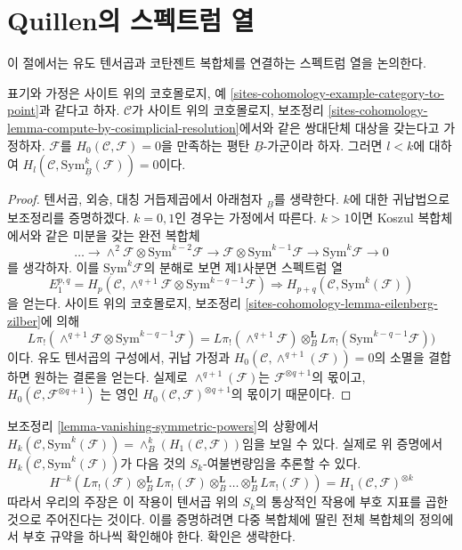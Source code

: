 \section{Quillen의 스펙트럼 열}
\label{section-spectral-sequence}

\noindent
이 절에서는 유도 텐서곱과 코탄젠트 복합체를 연결하는 스펙트럼 열을
논의한다.

\begin{lemma}
\label{lemma-vanishing-symmetric-powers}
표기와 가정은 사이트 위의 코호몰로지, 예
\ref{sites-cohomology-example-category-to-point}과 같다고 하자.
$\mathcal{C}$가 사이트 위의 코호몰로지, 보조정리
\ref{sites-cohomology-lemma-compute-by-cosimplicial-resolution}에서와 같은
쌍대단체 대상을 갖는다고 가정하자. $\mathcal{F}$를
$H_0(\mathcal{C}, \mathcal{F}) = 0$을 만족하는 평탄
$\underline{B}$-가군이라 하자. 그러면 $l < k$에 대하여
$H_l(\mathcal{C}, \text{Sym}_{\underline{B}}^k(\mathcal{F})) = 0$이다.
\end{lemma}

\begin{proof}
텐서곱, 외승, 대칭 거듭제곱에서 아래첨자 ${}_{\underline{B}}$를 생략한다.
$k$에 대한 귀납법으로 보조정리를 증명하겠다. $k = 0, 1$인 경우는
가정에서 따른다. $k > 1$이면 Koszul 복합체에서와 같은 미분을 갖는
완전 복합체
$$
\ldots \to
\wedge^2\mathcal{F} \otimes \text{Sym}^{k - 2}\mathcal{F} \to
\mathcal{F} \otimes \text{Sym}^{k - 1}\mathcal{F} \to
\text{Sym}^k\mathcal{F} \to 0
$$
를 생각하자. 이를 $\text{Sym}^k\mathcal{F}$의 분해로 보면 제1사분면
스펙트럼 열
$$
E_1^{p, q} =
H_p(\mathcal{C},
\wedge^{q + 1}\mathcal{F} \otimes \text{Sym}^{k - q - 1}\mathcal{F})
\Rightarrow
H_{p + q}(\mathcal{C}, \text{Sym}^k(\mathcal{F}))
$$
을 얻는다. 사이트 위의 코호몰로지, 보조정리
\ref{sites-cohomology-lemma-eilenberg-zilber}에 의해
$$
L\pi_!(\wedge^{q + 1}\mathcal{F} \otimes \text{Sym}^{k - q - 1}\mathcal{F}) =
L\pi_!(\wedge^{q + 1}\mathcal{F}) \otimes_B^\mathbf{L}
L\pi_!(\text{Sym}^{k - q - 1}\mathcal{F}))
$$
이다. 유도 텐서곱의 구성에서, 귀납 가정과
$H_0(\mathcal{C}, \wedge^{q + 1}(\mathcal{F})) = 0$의 소멸을 결합하면
원하는 결론을 얻는다. 실제로 $\wedge^{q + 1}(\mathcal{F})$는
$\mathcal{F}^{\otimes q + 1}$의 몫이고,
$H_0(\mathcal{C}, \mathcal{F}^{\otimes q + 1})$
는 영인 $H_0(\mathcal{C}, \mathcal{F})^{\otimes q + 1}$의 몫이기 때문이다.
\end{proof}

\begin{remark}
\label{remark-first-homology-symmetric-power}
보조정리 \ref{lemma-vanishing-symmetric-powers}의 상황에서
$H_k(\mathcal{C}, \text{Sym}^k(\mathcal{F})) =
\wedge^k_B(H_1(\mathcal{C}, \mathcal{F}))$임을 보일 수 있다. 실제로 위
증명에서 $H_k(\mathcal{C}, \text{Sym}^k(\mathcal{F}))$가 다음 것의
$S_k$-여불변량임을 추론할 수 있다.
$$
H^{-k}(L\pi_!(\mathcal{F}) \otimes_B^\mathbf{L}
L\pi_!(\mathcal{F}) \otimes_B^\mathbf{L}
\ldots \otimes_B^\mathbf{L} L\pi_!(\mathcal{F})) =
H_1(\mathcal{C}, \mathcal{F})^{\otimes k}
$$
따라서 우리의 주장은 이 작용이 텐서곱 위의 $S_k$의 통상적인 작용에 부호
지표를 곱한 것으로 주어진다는 것이다. 이를 증명하려면 다중 복합체에 딸린
전체 복합체의 정의에서 부호 규약을 하나씩 확인해야 한다. 확인은 생략한다.
\end{remark}

